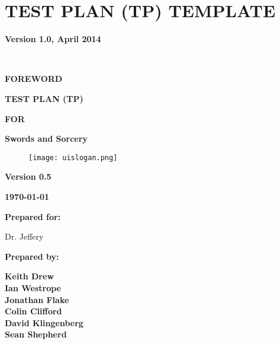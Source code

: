 \chapter{TEST PLAN (TP) TEMPLATE}


{\centering{}\bfseries\color{black}
Version 1.0, April 2014
\par}

\ 

{\centering{}\bfseries\color{black}
FOREWORD
\par}
\bigskip

{\centering\bfseries\color{black}
TEST PLAN (TP)}

{\centering{}\bfseries\color{black}
FOR
\par}


\bigskip

{\centering{}\bfseries\color{black}
Swords and Sorcery
\par}


\bigskip


\bigskip


\bigskip

\begin{figure}
\centering
\texttt{[image: uislogan.png]}
\end{figure}

\bigskip


\bigskip


\bigskip


\bigskip

{\centering{}\bfseries\color{black}
Version 0.5
\par}

{\centering{}\bfseries\color{black}
\today
\par}


\bigskip


\bigskip

{\centering{}\bfseries\color{black}
Prepared for: 
\par
Dr. Jeffery
\par}

\bigskip


\bigskip

{\centering{}\bfseries\color{black}
Prepared by:
\par}

{\centering{}\bfseries\color{black}
Keith Drew\\
Ian Westrope\\
Jonathan Flake\\
Colin Clifford\\
David Klingenberg\\
Sean Shepherd\\
\par}

